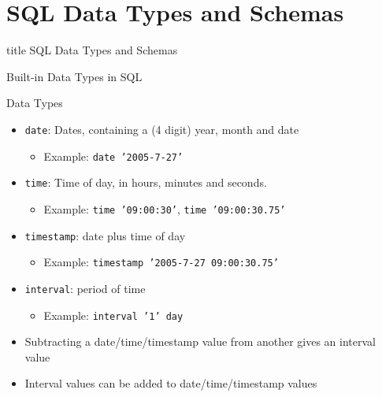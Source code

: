 \documentclass[aspectratio=169, xcolor=dvipsnames]{beamer}
\begin{document}
\section{SQL Data Types and Schemas}

\begin{frame}
  \vfill
  \centering
  \begin{beamercolorbox}[sep=8pt,center,shadow=true,rounded=true]{title}
    SQL Data Types and Schemas\par%
  \end{beamercolorbox}
  \vfill
\end{frame}

\begin{frame}{Built-in Data Types in SQL}
    \begin{block}{Data Types}
        \begin{itemize}[<+->]
            \item \texttt{date}: Dates, containing a (4 digit) year, month and date
            \begin{itemize}
                \item[$\triangleright$] Example: \texttt{date '2005-7-27'}
            \end{itemize}
            \item \texttt{time}: Time of day, in hours, minutes and seconds.
            \begin{itemize}
                \item[$\triangleright$] Example: \texttt{time '09:00:30'}, \texttt{time '09:00:30.75'}
            \end{itemize}
            \item \texttt{timestamp}: date plus time of day
            \begin{itemize}
                \item[$\triangleright$] Example: \texttt{timestamp '2005-7-27 09:00:30.75'}
            \end{itemize}
            \item \texttt{interval}: period of time
            \begin{itemize}
                \item[$\triangleright$] Example: \texttt{interval '1' day}
            \end{itemize}
            \item Subtracting a date/time/timestamp value from another gives an interval value
            \item Interval values can be added to date/time/timestamp values
        \end{itemize}
    \end{block}
\end{frame}
\end{document}
